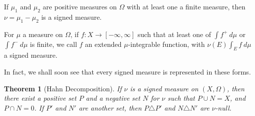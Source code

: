 \documentclass[12pt]{extarticle}
\theoremstyle{plain}
\newtheorem*{theorem}{Theorem}
\theoremstyle{definition}
\theoremstyle{note}
\renewcommand{\newline}{\hfill\break}
\begin{document}
If $\mu_1$ and $\mu_2$ are positive measures on $\Omega$ with at least one a finite measure, then $\nu = \mu_1 - \mu_2$ is a signed measure.\newline

For $\mu$ a measure on $\Omega$, if $f: X\rightarrow [-\infty,\infty]$ such that at least one of $\int f^{+}\:d\mu$ or $\int f^{-}\:d\mu$ is finite, we call $f$ an extended $\mu$-integrable function, with $\nu(E)\int_{E}f\:d\mu$ a signed measure.\newline

In fact, we shall soon see that every signed measure is represented in these forms.
\begin{theorem}[Hahn Decomposition]
  If $\nu$ is a signed measure on $\left(X,\Omega\right)$, then there exist a positive set $P$ and a negative set $N$ for $\nu$ such that $P\cup N = X$, and $P\cap N = 0$. If $P'$ and $N'$ are another set, then $P\triangle P'$ and $N\triangle N'$ are $\nu$-null.
\end{theorem}
\end{document}
